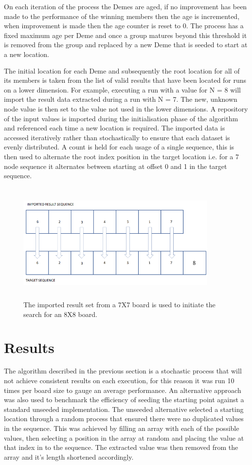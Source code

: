 \documentclass[a4paper,onecolumn,11pt]{article}
\begin{document}
On each iteration of the process the Demes are aged, if no improvement has been made to the performance of the winning members then the age is incremented, when improvement is made then the age counter is reset to 0. The process has a fixed maximum age per Deme and once a group matures beyond this threshold it is removed from the group and replaced by a new Deme that is seeded to start at a new location.

The initial location for each Deme and subsequently the root location for all of its members is taken from the list of valid results that have been located for runs on a lower dimension. For example, executing a run with a value for N = 8 will import the result data extracted during a run with N = 7. The new, unknown node value is then set to the value not used in the lower dimensions. A repository of the input values is imported during the initialisation phase of the algorithm and referenced each time a new location is required. The imported data is accessed iteratively rather than stochastically to ensure that each dataset is evenly distributed. A count is held for each usage of a single sequence, this is then used to alternate the root index position in the target location i.e. for a 7 node sequence it alternates between starting at offset 0 and 1 in the target sequence.

\begin{figure}[!htbp]
	\centering	
	\includegraphics[width=10cm, height=6cm]{ImportSequence}
	\caption{The imported result set from a 7X7 board is used to initiate the search for an 8X8 board.}
\end{figure}

\section{Results}
The algorithm described in the previous section is a stochastic process that will not achieve consistent results on each execution, for this reason it was run 10 times per board size to gauge an average performance. An alternative approach was also used to benchmark the efficiency of seeding the starting point against a standard unseeded implementation. The unseeded alternative selected a starting location through a random process that ensured there were no duplicated values in the sequence. This was achieved by filling an array with each of the possible values, then selecting a position in the array at random and placing the value at that index in to the sequence. The extracted value was then removed from the array and it's length shortened accordingly.
\end{document}

